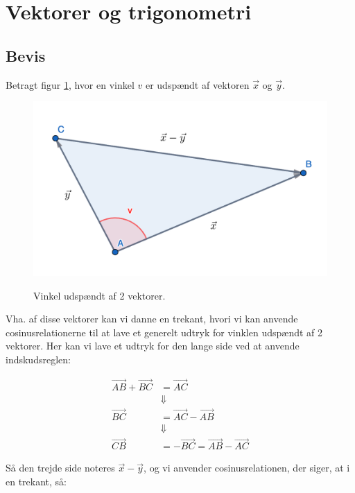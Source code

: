 \documentclass{article}
\makeatletter
\newenvironment{proofw}{\par
  \pushQED{\qed}%
  \normalfont \topsep6\p@\@plus6\p@\relax
  \trivlist
  \item[]\ignorespaces
}{%
  \popQED\endtrivlist\@endpefalse
}
\makeatother
\begin{document}
\section{Vektorer og trigonometri}

\subsection{Bevis}

\begin{proofw}
    
Betragt figur \ref{fig:trekant_vektor}, hvor en vinkel $v$ er udspændt af vektoren $\vec{x}$ og $\vec{y}$.

\begin{figure}[h]
    \centering
    \includegraphics[scale=0.3]{./skitser/trekant_vektor_skitse.png}
    \label{fig:trekant_vektor}
    \caption{Vinkel udspændt af 2 vektorer.}
\end{figure}

Vha. af disse vektorer kan vi danne en trekant, hvori vi kan anvende cosinusrelationerne
til at lave et generelt udtryk for vinklen udspændt af 2 vektorer.
Her kan vi lave et udtryk for den lange side ved at anvende indskudsreglen:

\begin{align*}
    \vec{AB}+\vec{BC}&=\vec{AC}
    \\
    &\Downarrow
    \\
    \vec{BC}&=\vec{AC}-\vec{AB}
    \\
    &\Downarrow
    \\
    \vec{CB}&=-\vec{BC}=\vec{AB}-\vec{AC}
\end{align*}

Så den trejde side noteres $\vec{x}-\vec{y}$, og vi anvender cosinusrelationen, der siger, at i en trekant, så:


\end{proofw}
\end{document}
